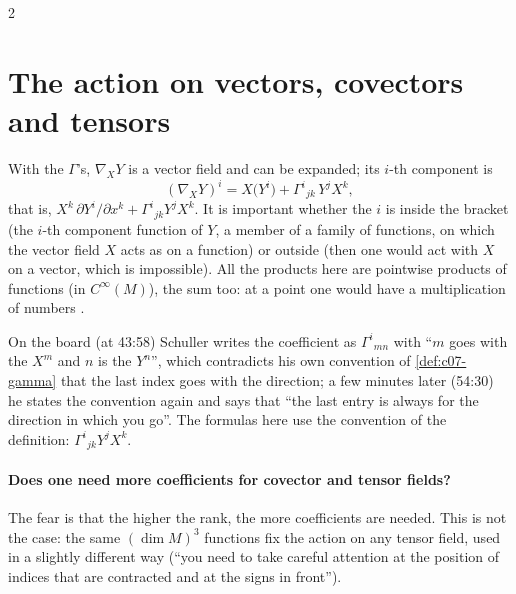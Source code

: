 \begin{paracol}{2}
\section{The action on vectors, covectors and tensors}\label{sec:c07-action}

With the $\Gamma$'s, $\nabla_XY$ is a vector field and can be expanded; its $i$-th component is
\begin{equation}\label{eq:c07-nablaV}
  (\nabla_XY)^i=X\bigl(Y^i\bigr)+\Gamma^i{}_{jk}\,Y^jX^k,
\end{equation}
that is, $X^k\,\partial Y^i/\partial x^k+\Gamma^i{}_{jk}Y^jX^k$. It is important whether the $i$ is inside the bracket (the $i$-th component function of $Y$, a member of a family of functions, on which the vector field $X$ acts as on a function) or outside (then one would act with $X$ on a vector, which is impossible). All the products here are pointwise products of functions (in $C^\infty(M)$), the sum too: at a point one would have a multiplication of numbers
.
\begin{coursenote}
On the board (at 43:58) Schuller writes the coefficient as $\Gamma^i{}_{mn}$ with ``$m$ goes with the $X^m$ and $n$ is the $Y^n$'', which contradicts his own convention of \cref{def:c07-gamma} that the last index goes with the direction; a few minutes later (54:30) he states the convention again and says that ``the last entry is always for the direction in which you go''. The formulas here use the convention of the definition: $\Gamma^i{}_{jk}Y^jX^k$.
\end{coursenote}

\paragraph{Does one need more coefficients for covector and tensor fields?} The fear is that the higher the rank, the more coefficients are needed. This is not the case: the same $(\dim M)^3$ functions fix the action on any tensor field, used in a slightly different way (``you need to take careful attention at the position of indices that are contracted and at the signs in front'').


\end{paracol}
